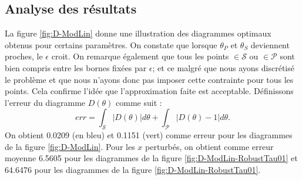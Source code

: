\subsection{Analyse des résultats}
La figure \ref{fig:D-ModLin} donne une illustration des diagrammes optimaux obtenus pour certains paramètres. On constate que lorsque $\theta_P$ et $\theta_S$ deviennent proches, le $\epsilon$ croit. On remarque également que tous les points $\in \mathcal{S}$ ou $\in \mathcal{P}$ sont bien compris entre les bornes fixées par $\epsilon$; et ce malgré que nous ayons discrétisé le problème et que nous n'ayons donc pas imposer cette contrainte pour tous les points. Cela confirme l'idée que l'approximation faite est acceptable. Définissons l'erreur du diagramme $D(\theta)$ comme suit : 
\begin{equation} \label{eq:erreurDiagramme}
err = \int _{\mathcal{S}} |D(\theta)| d\theta + \int_{\mathcal{P}} |D(\theta) - 1| d\theta.
\end{equation}
On obtient 0.0209 (en bleu) et 0.1151 (vert) comme erreur pour les diagrammes de la figure \ref{fig:D-ModLin}. Pour les $x$ perturbés, on obtient comme erreur moyenne 6.5605 pour les diagrammes de la figure \ref{fig:D-ModLin-RobustTau01} et 64.6476 pour les diagrammes de la figure \ref{fig:D-ModLin-RobustTau01}.

